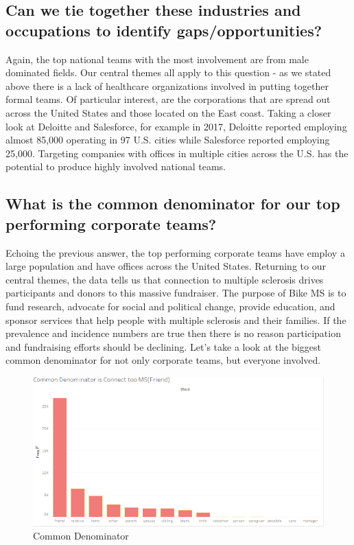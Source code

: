 \documentclass[]{article}
\begin{document}
\hypertarget{can-we-tie-together-these-industries-and-occupations-to-identify-gapsopportunities}{%
\subsection{Can we tie together these industries and occupations to
identify
gaps/opportunities?}\label{can-we-tie-together-these-industries-and-occupations-to-identify-gapsopportunities}}

Again, the top national teams with the most involvement are from male
dominated fields. Our central themes all apply to this question - as we
stated above there is a lack of healthcare organizations involved in
putting together formal teams. Of particular interest, are the
corporations that are spread out across the United States and those
located on the East coast. Taking a closer look at Deloitte and
Salesforce, for example in 2017, Deloitte reported employing almost
85,000 operating in 97 U.S. cities while Salesforce reported employing
25,000. Targeting companies with offices in multiple cities across the
U.S. has the potential to produce highly involved national teams.

\hypertarget{what-is-the-common-denominator-for-our-top-performing-corporate-teams}{%
\subsection{What is the common denominator for our top performing
corporate
teams?}\label{what-is-the-common-denominator-for-our-top-performing-corporate-teams}}

Echoing the previous answer, the top performing corporate teams have
employ a large population and have offices across the United States.
Returning to our central themes, the data tells us that connection to
multiple sclerosis drives participants and donors to this massive
fundraiser. The purpose of Bike MS is to fund research, advocate for
social and political change, provide education, and sponsor services
that help people with multiple sclerosis and their families. If the
prevalence and incidence numbers are true then there is no reason
participation and fundraising efforts should be declining. Let's take a
look at the biggest common denominator for not only corporate teams, but
everyone involved.

\begin{figure}
\centering
\includegraphics{commondenominator.png}
\caption{Common Denominator}
\end{figure}
\end{document}
